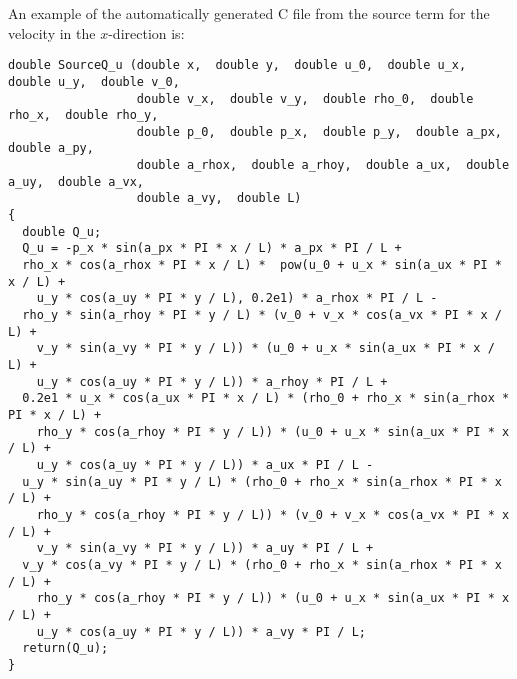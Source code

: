 \documentclass[10pt]{article}
\begin{document}
An example of the automatically generated C file from the source term for the velocity in the $x$-direction is:
\begin{verbatim}
double SourceQ_u (double x,  double y,  double u_0,  double u_x,  double u_y,  double v_0,
                  double v_x,  double v_y,  double rho_0,  double rho_x,  double rho_y,
                  double p_0,  double p_x,  double p_y,  double a_px,  double a_py,
                  double a_rhox,  double a_rhoy,  double a_ux,  double a_uy,  double a_vx,
                  double a_vy,  double L)
{
  double Q_u;
  Q_u = -p_x * sin(a_px * PI * x / L) * a_px * PI / L +
  rho_x * cos(a_rhox * PI * x / L) *  pow(u_0 + u_x * sin(a_ux * PI * x / L) +
    u_y * cos(a_uy * PI * y / L), 0.2e1) * a_rhox * PI / L -
  rho_y * sin(a_rhoy * PI * y / L) * (v_0 + v_x * cos(a_vx * PI * x / L) +
    v_y * sin(a_vy * PI * y / L)) * (u_0 + u_x * sin(a_ux * PI * x / L) +
    u_y * cos(a_uy * PI * y / L)) * a_rhoy * PI / L +
  0.2e1 * u_x * cos(a_ux * PI * x / L) * (rho_0 + rho_x * sin(a_rhox * PI * x / L) +
    rho_y * cos(a_rhoy * PI * y / L)) * (u_0 + u_x * sin(a_ux * PI * x / L) +
    u_y * cos(a_uy * PI * y / L)) * a_ux * PI / L -
  u_y * sin(a_uy * PI * y / L) * (rho_0 + rho_x * sin(a_rhox * PI * x / L) +
    rho_y * cos(a_rhoy * PI * y / L)) * (v_0 + v_x * cos(a_vx * PI * x / L) +
    v_y * sin(a_vy * PI * y / L)) * a_uy * PI / L +
  v_y * cos(a_vy * PI * y / L) * (rho_0 + rho_x * sin(a_rhox * PI * x / L) +
    rho_y * cos(a_rhoy * PI * y / L)) * (u_0 + u_x * sin(a_ux * PI * x / L) +
    u_y * cos(a_uy * PI * y / L)) * a_vy * PI / L;
  return(Q_u);
}
\end{verbatim}
\end{document}
